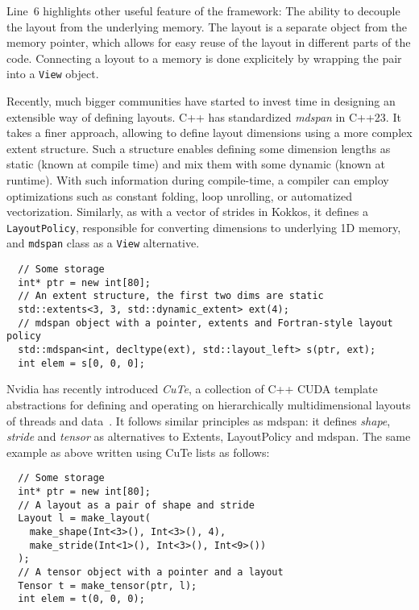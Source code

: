 Line~$6$ highlights other useful feature of the framework: The ability to decouple the layout from the underlying memory. The layout is a separate object from the memory pointer, which allows for easy reuse of the layout in different parts of the code. Connecting a loyout to a memory is done explicitely by wrapping the pair into a \texttt{View} object.

Recently, much bigger communities have started to invest time in designing an extensible way of defining layouts. C++ has standardized \emph{mdspan} in C++23. It takes a finer approach, allowing to define layout dimensions using a more complex extent structure. Such a structure enables defining some dimension lengths as static (known at compile time) and mix them with some dynamic (known at runtime). With such information during compile-time, a compiler can employ optimizations such as constant folding, loop unrolling, or automatized vectorization. Similarly, as with a vector of strides in Kokkos, it defines a \texttt{LayoutPolicy}, responsible for converting dimensions to underlying 1D memory, and \texttt{mdspan} class as a \texttt{View} alternative.

\begin{verbatim}
  // Some storage
  int* ptr = new int[80];
  // An extent structure, the first two dims are static 
  std::extents<3, 3, std::dynamic_extent> ext(4);
  // mdspan object with a pointer, extents and Fortran-style layout policy
  std::mdspan<int, decltype(ext), std::layout_left> s(ptr, ext);
  int elem = s[0, 0, 0];
\end{verbatim}

Nvidia has recently introduced \emph{CuTe}, a collection of C++ CUDA template abstractions for defining and operating on hierarchically multidimensional layouts of threads and data~\cite{cute-online}. It follows similar principles as mdspan: it defines \emph{shape}, \emph{stride} and \emph{tensor} as alternatives to Extents, LayoutPolicy and mdspan. The same example as above written using CuTe lists as follows:

\begin{verbatim}
  // Some storage
  int* ptr = new int[80];
  // A layout as a pair of shape and stride
  Layout l = make_layout(
    make_shape(Int<3>(), Int<3>(), 4),
    make_stride(Int<1>(), Int<3>(), Int<9>())
  );
  // A tensor object with a pointer and a layout
  Tensor t = make_tensor(ptr, l);
  int elem = t(0, 0, 0);
\end{verbatim}

